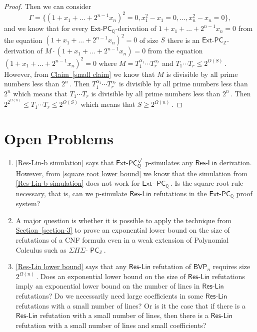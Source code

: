 \documentclass[11pt]{article}
\newcommand{\expref}[2]{\texorpdfstring{\hyperref[#2]{#1~\ref{#2}}}{#1~\ref{#2}}}
\newcommand{\Q}{{\mathbb Q}}
\newcommand{\Z}{{\mathbb Z}}
\begin{document}
\begin{proof}
Then we can consider 
$$
\Gamma = \{(1 + x_1 + \ldots + 2^{n - 1} x_n)^2 = 0, x_1^2 - x_1 = 0, \ldots, x_n^2 - x_n = 0\},
$$
%
and we know that for every $\mathsf{Ext}$-$\mathsf{PC}_{\Q}$-derivation of $1 + x_1 + \ldots + 2^{n - 1} x_n = 0$ from the equation $(1 + x_1 + \ldots + 2^{n - 1} x_n)^2 = 0$ of size $S$ there is an $\mathsf{Ext}$-$\mathsf{PC}_{\Z}$-derivation of $M \cdot (1 + x_1 + \ldots + 2^{n - 1} x_n) = 0$ from the equation $(1 + x_1 + \ldots + 2^{n - 1} x_n)^2 = 0$ where $M = T_1^{\alpha_1} \cdots T_r^{\alpha_r}$ and %
$T_1 \cdots T_r \le 2^{O(S)}\,.$ %
 However, from %
%
%
\expref{Claim}{small claim}   %
we know that $M$ is divisible by all prime numbers less than %
$2^n\,.$ %
 Then $T_1^{\alpha_1} \cdots T_r^{\alpha_r}$ is divisible by all prime numbers less than $2^n$ which means that $T_1 \cdots T_r$ is divisible by all prime numbers less than %
$2^n\,.$ %
%
Then $2^{2^{\Omega(n)}} \le T_1 \cdots T_r \le 2^{O(S)}$ %
which means that %
$S \ge 2^{\Omega(n)}\,.$ %
\end{proof}  %

%
\section{Open Problems} %
\begin{enumerate}
    \item \autoref{Res-Lin-b simulation} says that $\mathsf{Ext}$-$\mathsf{PC}_{\Q}^{\surd}$ p-simulates any $\mathsf{Res}$-$\mathsf{Lin}$ derivation. However, from \autoref{square root lower bound} we know that the simulation from \autoref{Res-Lin-b simulation} does not work  for $\mathsf{Ext}$-%
$\mathsf{PC}_{\Q}\,.$ %
 Is the square root rule necessary, that is, can we p-simulate  $\mathsf{Res}$-$\mathsf{Lin}$ refutations in the $\mathsf{Ext}$-$\mathsf{PC}_{\Q}$ proof system?
    \item A major question is whether it is possible to apply the technique from \expref{Section}{section-3} to prove an exponential lower bound on the size of refutations of a CNF formula even in a weak extension of Polynomial Calculus such as $\Sigma\Pi\Sigma$-%
$\mathsf{PC}_{\Z}\,.$ %
%
    \item \autoref{Res-Lin lower bound} says that any $\mathsf{Res}$-$\mathsf{Lin}$ refutation of $\mathsf{BVP}_n$ requires size  %
$2^{\Omega(n)}\,.$ %
 Does an exponential lower bound on the size of $\mathsf{Res}$-$\mathsf{Lin}$ refutations imply an exponential lower bound on the number of lines in $\mathsf{Res}$-$\mathsf{Lin}$ refutations? Do we necessarily need large coefficients in some $\mathsf{Res}$-$\mathsf{Lin}$ refutations with a small number of lines? Or is it the case that if there is a $\mathsf{Res}$-$\mathsf{Lin}$ refutation with a small number of lines, then there is a $\mathsf{Res}$-$\mathsf{Lin}$ refutation with a small number of lines and small coefficients? %
\end{enumerate}
\end{document}
